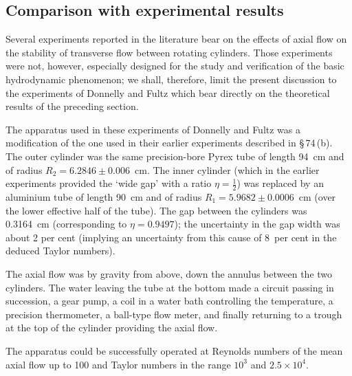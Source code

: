 

\subsection{Comparison with experimental results}
\label{sec:79d}

Several experiments reported in the literature bear on the effects of axial flow on the stability of transverse flow between rotating cylinders. Those experiments were not, however, especially designed for the study and verification of the basic hydrodynamic phenomenon; we shall, therefore, limit the present discussion to the experiments of Donnelly and Fultz which bear directly on the theoretical results of the preceding section.

The apparatus used in these experiments of Donnelly and Fultz was a modification of the one used in their earlier experiments described in \S\,74\,(b). The outer cylinder was the same precision-bore Pyrex tube of length 94~cm and of radius $R_2 = 6.2846\pm 0.006$~cm. The inner cylinder (which in the earlier experiments provided the `wide gap' with a ratio $\eta = \frac{1}{2}$) was replaced by an aluminium tube of length 90~cm and of radius $R_1 = 5.9682\pm 0.0006$~cm (over the lower effective half of the tube). The gap between the cylinders was 0.3164~cm (corresponding to $\eta = 0.9497$); the uncertainty in the gap width was about 2 per cent (implying an uncertainty from this cause of 8~per cent in the deduced Taylor numbers).

The axial flow was by gravity from above, down the annulus between the two cylinders. The water leaving the tube at the bottom made a circuit passing in succession, a gear pump, a coil in a water bath controlling the temperature, a precision thermometer, a ball-type flow meter, and finally returning to a trough at the top of the cylinder providing the axial flow.

The apparatus could be successfully operated at Reynolds numbers of the mean axial flow up to 100 and Taylor numbers in the range $10^3$ and $2.5\times 10^4$.

